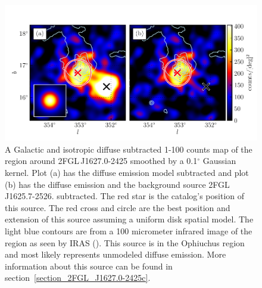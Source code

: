 \documentclass[12pt,preprint]{aastex}
\newcommand{\gev}{\text{GeV}\xspace}
\renewcommand{\deg}{\ensuremath{^\circ}\xspace}
\begin{document}
\begin{figure}
  \begin{center}
    \includegraphics[type=pdf,ext=.pdf,read=.pdf]{source_plots/source_1FGL_J1628.6-2419c}
  \end{center}
  \caption{
  A Galactic and isotropic diffuse subtracted 1-100 \gev counts
  map of the region around 2FGL\,J1627.0-2425 smoothed by a 0.1\deg
  Gaussian kernel.  Plot (a) has the diffuse emission model subtracted
  and plot (b) has the diffuse emission and 
  the background source 2FGL\,J1625.7-2526.  
  subtracted.  The red star is the catalog's position of this source.
  The red cross and circle are the best position and extension of
  this source assuming a uniform disk spatial model.  The light
  blue contours are from a 100 micrometer infrared image of the region
  as seen by IRAS (\cite{iras_rho_ophiuci}). This source is in the
  Ophiuchus region and most likely represents unmodeled diffuse
  emission.  More information about this source can be found in
  section~\ref{section_2FGL_J1627.0-2425c}.
  }\label{1FGL_J1628.6-2419c}
\end{figure}
\end{document}

